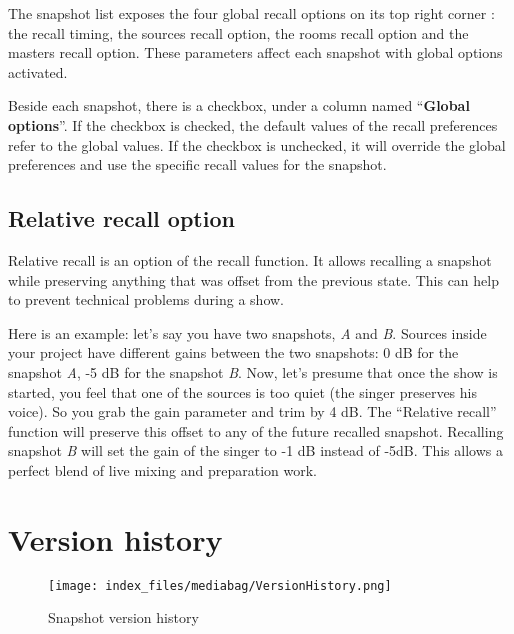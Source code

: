 \documentclass[
  letterpaper,
  DIV=11,
  numbers=noendperiod]{scrreport}
\begin{document}
The snapshot list exposes the four global recall options on its top
right corner : the recall timing, the sources recall option, the rooms
recall option and the masters recall option. These parameters affect
each snapshot with global options activated.

Beside each snapshot, there is a checkbox, under a column named
``\textbf{Global options}''. If the checkbox is checked, the default
values of the recall preferences refer to the global values. If the
checkbox is unchecked, it will override the global preferences and use
the specific recall values for the snapshot.

\hypertarget{relative-recall-option}{%
\subsection{Relative recall option}\label{relative-recall-option}}

Relative recall is an option of the recall function. It allows recalling
a snapshot while preserving anything that was offset from the previous
state. This can help to prevent technical problems during a show.

Here is an example: let's say you have two snapshots, \emph{A} and
\emph{B}. Sources inside your project have different gains between the
two snapshots: 0 dB for the snapshot \emph{A}, -5 dB for the snapshot
\emph{B}. Now, let's presume that once the show is started, you feel
that one of the sources is too quiet (the singer preserves his voice).
So you grab the gain parameter and trim by 4 dB. The ``Relative recall''
function will preserve this offset to any of the future recalled
snapshot. Recalling snapshot \emph{B} will set the gain of the singer to
-1 dB instead of -5dB. This allows a perfect blend of live mixing and
preparation work.

\hypertarget{version-history}{%
\section{Version history}\label{version-history}}

\begin{figure}

{\centering \texttt{[image: index\_files/mediabag/VersionHistory.png]}

}

\caption{Snapshot version history}

\end{figure}
\end{document}
